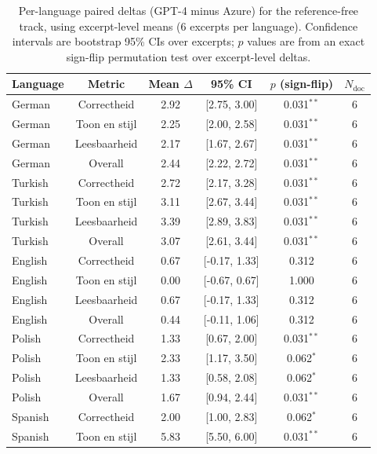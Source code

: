 \begin{table}[htbp]
\centering
\scriptsize
\renewcommand{\arraystretch}{1.15}
\setlength{\tabcolsep}{6pt}
\caption{Per-language paired deltas (GPT-4 minus Azure) for the reference-free track, using excerpt-level means (6 excerpts per language). Confidence intervals are bootstrap 95\% CIs over excerpts; $p$ values are from an exact sign-flip permutation test over excerpt-level deltas.}
\label{tab:ref-free-deltas-by-language}
\begin{tabular}{@{}l c c c c c@{}}
\toprule
Language & Metric & Mean $\Delta$ & 95\% CI & $p$ (sign-flip) & $N_{\text{doc}}$ \\
\midrule
German & Correctheid & 2.92 & [2.75, 3.00] & 0.031$^{**}$ & 6 \\
German & Toon en stijl & 2.25 & [2.00, 2.58] & 0.031$^{**}$ & 6 \\
German & Leesbaarheid & 2.17 & [1.67, 2.67] & 0.031$^{**}$ & 6 \\
German & Overall & 2.44 & [2.22, 2.72] & 0.031$^{**}$ & 6 \\
\addlinespace[2pt]
Turkish & Correctheid & 2.72 & [2.17, 3.28] & 0.031$^{**}$ & 6 \\
Turkish & Toon en stijl & 3.11 & [2.67, 3.44] & 0.031$^{**}$ & 6 \\
Turkish & Leesbaarheid & 3.39 & [2.89, 3.83] & 0.031$^{**}$ & 6 \\
Turkish & Overall & 3.07 & [2.61, 3.44] & 0.031$^{**}$ & 6 \\
\addlinespace[2pt]
English & Correctheid & 0.67 & [-0.17, 1.33] & 0.312 & 6 \\
English & Toon en stijl & 0.00 & [-0.67, 0.67] & 1.000 & 6 \\
English & Leesbaarheid & 0.67 & [-0.17, 1.33] & 0.312 & 6 \\
English & Overall & 0.44 & [-0.11, 1.06] & 0.312 & 6 \\
\addlinespace[2pt]
Polish & Correctheid & 1.33 & [0.67, 2.00] & 0.031$^{**}$ & 6 \\
Polish & Toon en stijl & 2.33 & [1.17, 3.50] & 0.062$^{*}$ & 6 \\
Polish & Leesbaarheid & 1.33 & [0.58, 2.08] & 0.062$^{*}$ & 6 \\
Polish & Overall & 1.67 & [0.94, 2.44] & 0.031$^{**}$ & 6 \\
\addlinespace[2pt]
Spanish & Correctheid & 2.00 & [1.00, 2.83] & 0.062$^{*}$ & 6 \\
Spanish & Toon en stijl & 5.83 & [5.50, 6.00] & 0.031$^{**}$ & 6 \\

\end{tabular}
\end{table}
